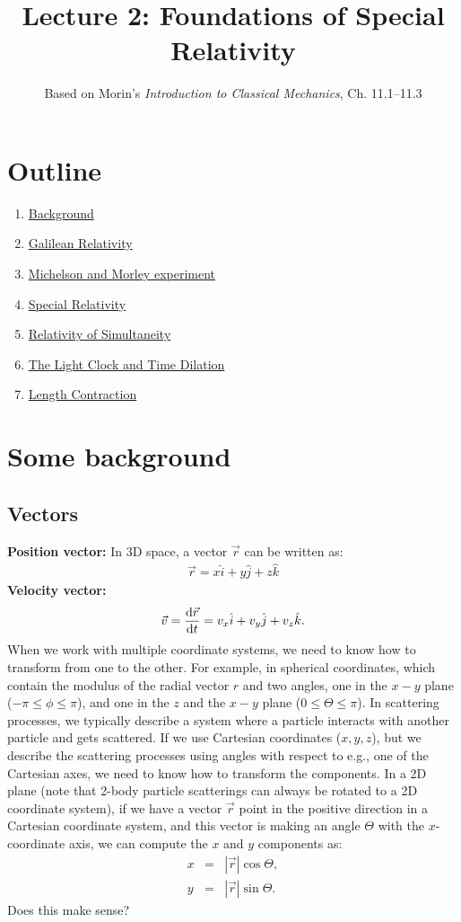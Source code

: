 \documentclass[12pt]{article}
\title{\textbf{Lecture 2: Foundations of Special Relativity}}
\author{Based on Morin's \textit{Introduction to Classical Mechanics}, Ch. 11.1–11.3}
\date{}
\newcommand{\be}{\begin{eqnarray}}
\newcommand{\ee}{\end{eqnarray}}
\begin{document}
\maketitle

\section*{Outline}
\begin{enumerate}
    \item \href{sec:background}{Background}
    \item \href{sec:GR}{Galilean Relativity}
    \item \href{sec:MM}{Michelson and Morley experiment} 
    \item \href{sec:SR}{Special Relativity}
    \item \href{sec:Rsim}{Relativity of Simultaneity}
    \item \href{sec:tD}{The Light Clock and Time Dilation}
    \item \href{sec:lC}{Length Contraction} 
\end{enumerate}

\section{Some background}\label{sec:background}
\subsection{Vectors}
\textbf{Position vector:} In 3D space, a vector $\vec{r}$ can be written as:
\be
\vec{r} = x \hat{i} + y \hat{j} + z \hat{k}
\ee
\textbf{Velocity vector:}
\be
\vec{v} = \dv{\vec{r}}{t} = v_x \hat{i} + v_y \hat{j} + v_z \hat{k}.
\ee
When we work with multiple coordinate systems, we need to know how to transform from one to the other. For example, in spherical coordinates, which contain the modulus of the radial vector $r$ and two angles, one in the $x-y$ plane ($-\pi \leq \phi\leq \pi$), and one in the $z$ and the $x-y$ plane ($0 \leq \Theta \leq \pi$). In scattering processes, we typically describe a system where a particle interacts with another particle and gets scattered. If we use Cartesian coordinates ($x,y,z$), but we describe the scattering processes using angles with respect to e.g., one of the Cartesian axes, we need to know how to transform the components. In a 2D plane (note that 2-body particle scatterings can always be rotated to a 2D coordinate system), if we have a vector $\vec{r}$ point in the positive direction in a Cartesian coordinate system, and this vector is making an angle $\Theta$ with the $x$-coordinate axis, we can compute the $x$ and $y$ components as:
\be
x &=& |\vec{r}| \cos \Theta, \nonumber \\
y &=& |\vec{r}| \sin \Theta. \nonumber
\ee
Does this make sense? 
\end{document}
